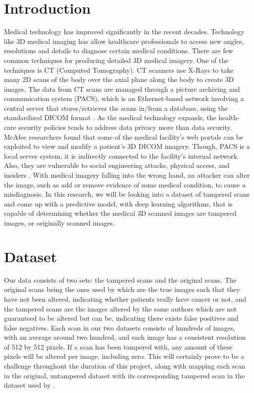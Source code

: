 \documentclass[conference]{IEEEtran}
\begin{document}
\section{Introduction}
Medical technology has improved significantly in the recent decades. Technology like 3D medical imaging has allow healthcare professionals to access new angles, resolutions and details to diagnose certain medical conditions. There are few common techniques for producing detailed 3D medical imagery. One of the techniques is CT (Computed Tomography). CT scanners use X-Rays to take many 2D scans of the body over the axial plane along the body to create 3D images. The data from CT scans are managed through a picture archiving and communication system (PACS), which is an Ethernet-based network involving a central server that stores/retrieves the scans in/from a database, using the standardized DICOM format \cite{study}. As the medical technology expands, the health-care security policies tends to address data privacy more than data security. McAfee researchers found that some of the medical facility's web portals can be exploited to view and modify a patient's 3D DICOM imagery. Though, PACS is a local server system, it is indirectly connected to the facility's internal network. Also, they are vulnerable to social engineering attacks, physical access, and insiders \cite{study}. With medical imagery falling into the wrong hand, an attacker can alter the image, such as add or remove evidence of some medical condition, to cause a misdiagnosis. In this research, we will be looking into a dataset of tampered scans and come up with a predictive model, with deep learning algorithms, that is capable of determining whether the medical 3D scanned images are tampered images, or originally scanned images.

\section{Dataset}
Our data consists of two sets: the tampered scans and the original scans. The original scans being the ones used by \cite{study} which are the true images such that they have not been altered, indicating whether patients really have cancer or not, and the tampered scans are the images altered by the same authors which are not guaranteed to be altered but can be, indicating there exists false positives and false negatives. Each scan in our two datasets consists of hundreds of images, with an average around two hundred, and each image has a consistent resolution of 512 by 512 pixels. If a scan has been tampered with, any amount of these pixels will be altered per image, including zero. This will certainly prove to be a challenge throughout the duration of this project, along with mapping each scan in the original, untampered dataset with its corresponding tampered scan in the dataset used by \cite{study}.
\end{document}
